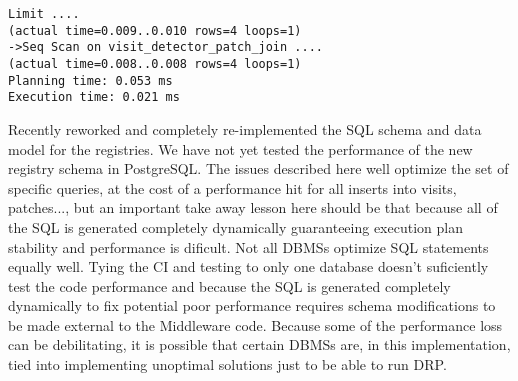 \begin{lstlisting}[style=sqlprompt]
Limit ....
(actual time=0.009..0.010 rows=4 loops=1)
->Seq Scan on visit_detector_patch_join ....
(actual time=0.008..0.008 rows=4 loops=1)
Planning time: 0.053 ms
Execution time: 0.021 ms
\end{lstlisting}

Recently  reworked and completely re-implemented the SQL schema and data model for the registries.
We have not yet tested the performance of the new registry schema in PostgreSQL.
The issues described here well optimize the set of specific queries, at the cost of a performance hit for all inserts into visits, patches..., but an important take away lesson here should be that because all of the SQL is generated completely dynamically guaranteeing execution plan stability and performance is dificult.
Not all DBMSs optimize SQL statements equally well.
Tying the CI and testing to only one database doesn't suficiently test the code performance and because the SQL is generated completely dynamically to fix potential poor performance requires schema modifications to be made external to the Middleware code.
Because some of the performance loss can be debilitating, it is possible that certain DBMSs are, in this implementation, tied into implementing unoptimal solutions just to be able to run DRP.
